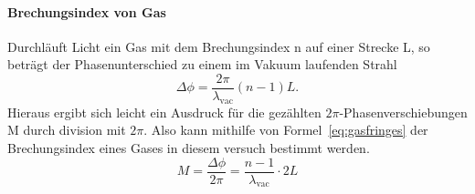 \paragraph{Brechungsindex von Gas}
Durchläuft Licht ein Gas mit dem Brechungsindex n auf einer 
Strecke L, so beträgt der Phasenunterschied zu einem im Vakuum 
laufenden Strahl
\begin{equation}
\Delta\phi = \frac{2\pi}{\lambda_\text{vac}}(n-1)L.
\end{equation}
Hieraus ergibt sich leicht ein Ausdruck für die gezählten 
$2\pi$-Phasenverschiebungen M durch division mit $2\pi$.
Also kann mithilfe von Formel~\eqref{eq:gasfringes} der 
Brechungsindex eines Gases in diesem versuch bestimmt werden.
\begin{equation}
M = \frac{\Delta\phi}{2\pi} = \frac{n-1}{\lambda_\text{vac}}\cdot 2L
\label{eq:gasfringes}
\end{equation}
